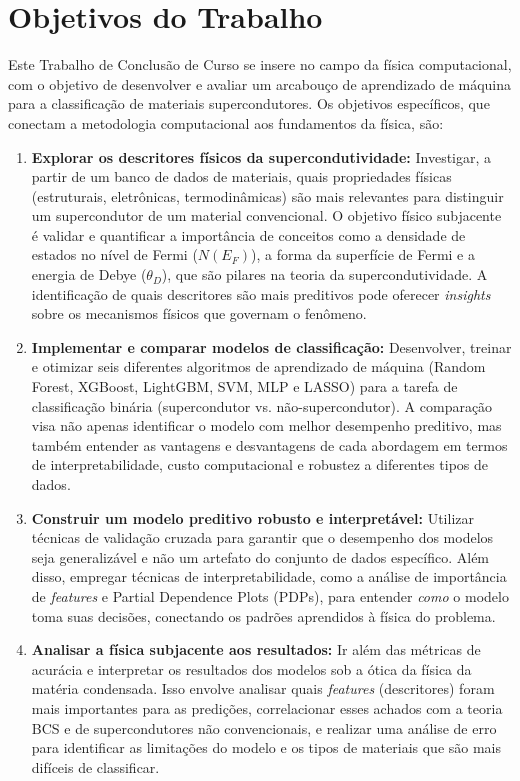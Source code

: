 \documentclass[12pt, a4paper, oneside]{report}
\begin{document}
\section{Objetivos do Trabalho}

Este Trabalho de Conclusão de Curso se insere no campo da física computacional, com o objetivo de desenvolver e avaliar um arcabouço de aprendizado de máquina para a classificação de materiais supercondutores. Os objetivos específicos, que conectam a metodologia computacional aos fundamentos da física, são:

\begin{enumerate}
    \item \textbf{Explorar os descritores físicos da supercondutividade:} Investigar, a partir de um banco de dados de materiais, quais propriedades físicas (estruturais, eletrônicas, termodinâmicas) são mais relevantes para distinguir um supercondutor de um material convencional. O objetivo físico subjacente é validar e quantificar a importância de conceitos como a densidade de estados no nível de Fermi ($N(E_F)$), a forma da superfície de Fermi e a energia de Debye ($\theta_D$), que são pilares na teoria da supercondutividade. A identificação de quais descritores são mais preditivos pode oferecer \textit{insights} sobre os mecanismos físicos que governam o fenômeno.
    
    \item \textbf{Implementar e comparar modelos de classificação:} Desenvolver, treinar e otimizar seis diferentes algoritmos de aprendizado de máquina (Random Forest, XGBoost, LightGBM, SVM, MLP e LASSO) para a tarefa de classificação binária (supercondutor vs. não-supercondutor). A comparação visa não apenas identificar o modelo com melhor desempenho preditivo, mas também entender as vantagens e desvantagens de cada abordagem em termos de interpretabilidade, custo computacional e robustez a diferentes tipos de dados.
    
    \item \textbf{Construir um modelo preditivo robusto e interpretável:} Utilizar técnicas de validação cruzada para garantir que o desempenho dos modelos seja generalizável e não um artefato do conjunto de dados específico. Além disso, empregar técnicas de interpretabilidade, como a análise de importância de \textit{features} e Partial Dependence Plots (PDPs), para entender \textit{como} o modelo toma suas decisões, conectando os padrões aprendidos à física do problema.
    
    \item \textbf{Analisar a física subjacente aos resultados:} Ir além das métricas de acurácia e interpretar os resultados dos modelos sob a ótica da física da matéria condensada. Isso envolve analisar quais \textit{features} (descritores) foram mais importantes para as predições, correlacionar esses achados com a teoria BCS e de supercondutores não convencionais, e realizar uma análise de erro para identificar as limitações do modelo e os tipos de materiais que são mais difíceis de classificar.
\end{enumerate}
\end{document}
